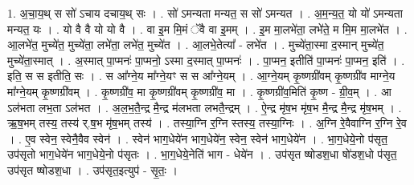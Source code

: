 \documentclass[17pt]{extarticle}
\begin{document}
1. अ॒चा॒य॒थ् स सो॑ ऽचाय दचाय॒थ् सः । . सो॑ ऽमन्यता मन्यत॒ स सो॑ ऽमन्यत । . अ॒म॒न्य॒त॒ यो यो॑ ऽमन्यता मन्यत॒ यः । . यो वै वै यो यो वै । . वा इ॒म मि॒मं ॅवै वा इ॒मम् । . इ॒म मा॒लभे॑ता॒ लभे॑ते॒ म मि॒म मा॒लभे॑त । . आ॒लभे॑त॒ मुच्ये॑त॒ मुच्ये॑ता॒ लभे॑ता॒ लभे॑त॒ मुच्ये॑त । . आ॒लभे॒तेत्या᳚ - लभे॑त । . मुच्ये॑ता॒स्मा द॒स्मान् मुच्ये॑त॒ मुच्ये॑ता॒स्मात् । . अ॒स्मात् पा॒प्मनः॑ पा॒प्मनो॒ ऽस्मा द॒स्मात् पा॒प्मनः॑ । . पा॒प्मन॒ इतीति॑ पा॒प्मनः॑ पा॒प्मन॒ इति॑ । . इति॒ स स इतीति॒ सः । . स आ᳚ग्ने॒य मा᳚ग्ने॒यꣳ स स आ᳚ग्ने॒यम् । . आ॒ग्ने॒यम् कृ॒ष्णग्री॑वम् कृ॒ष्णग्री॑व माग्ने॒य मा᳚ग्ने॒यम् कृ॒ष्णग्री॑वम् । . कृ॒ष्णग्री॑व॒ मा कृ॒ष्णग्री॑वम् कृ॒ष्णग्री॑व॒ मा । . कृ॒ष्णग्री॑व॒मिति॑ कृ॒ष्ण - ग्री॒व॒म् । . आ ऽल॑भता लभ॒ता ऽल॑भत । . अ॒ल॒भ॒तै॒न्द्र मै॒न्द्र म॑लभता लभतै॒न्द्रम् । . ऐ॒न्द्र मृ॑ष॒भ मृ॑ष॒भ मै॒न्द्र मै॒न्द्र मृ॑ष॒भम् । . ऋ॒ष॒भम् तस्य॒ तस्य॑ र्.ष॒भ मृ॑ष॒भम् तस्य॑ । . तस्या॒ग्नि र॒ग्नि स्तस्य॒ तस्या॒ग्निः । . अ॒ग्नि रे॒वैवाग्नि र॒ग्नि रे॒व । . ए॒व स्वेन॒ स्वेनै॒वैव स्वेन॑ । . स्वेन॑ भाग॒धेये॑न भाग॒धेये॑न॒ स्वेन॒ स्वेन॑ भाग॒धेये॑न । . भा॒ग॒धेये॒नो प॑सृत॒ उप॑सृतो भाग॒धेये॑न भाग॒धेये॒नो प॑सृतः । . भा॒ग॒धेये॒नेति॑ भाग - धेये॑न । . उप॑सृत ष्षोडश॒धा षो॑डश॒धो प॑सृत॒ उप॑सृत ष्षोडश॒धा । . उप॑सृत॒इत्युप॑ - सृ॒तः॒ । \newline
\end{document}
